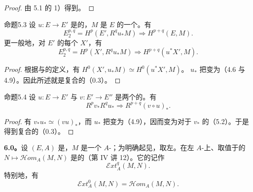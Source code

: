 \begin{proof}由 5.1 的 1）得到。\end{proof}
\begin{SGAresult}{命题}{5.3}
设 $u:E\to E'$ 是的，$M$ 是 $E$ 的一个。有
\begin{equation}E_2^{p,q}=H^p(E',R^qu_*M)\Longrightarrow H^{p+q}(E,M).\tag{5.3.1}\end{equation}
更一般地，对 $E'$ 的每个 $X'$，有
\begin{equation}E_2^{p,q}=H^p(X',R^qu_*M)\Longrightarrow H^{p+q}(u^*X',M).\tag{5.3.2}\end{equation}
\end{SGAresult}
\begin{proof}根据与的定义，有 $H^0(X',u_*M)\simeq H^0(u^*X',M)$。 $u_*$ 把变为（4.6 与 4.9）。因此所述就是复合的（0.3）。\end{proof}
\begin{SGAresult}{命题}{5.4}
设 $u:E\to E'$ 与 $v:E'\to E''$ 是两个的。有
\[R^pv_*R^qu_*\Longrightarrow R^{p+q}(v\circ u)_*.\]
\end{SGAresult}
\begin{proof}有 $v_*u_*\simeq(vu)_*$，而 $u_*$ 把变为（4.9），因而变为对于 $v_*$ 的（5.2）。于是得到复合的（0.3）。\end{proof}
\textbf{6.0。}设 $(E,A)$ 是，$M$ 是一个 $A$-；为明确起见，取左。在左 $A$-上、取值于的 $N\mapsto\mathscr Hom_A(M,N)$ 是的（第 IV 讲 12）。它的记作
\begin{equation}\mathscr Ext_A^q(M,N).\tag{6.0.1}\end{equation}
特别地，有
\begin{equation}\mathscr Ext_A^0(M,N)=\mathscr Hom_A(M,N).\tag{6.0.2}\end{equation}
